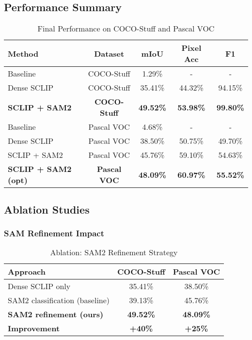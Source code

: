 \subsection{Performance Summary}

\begin{table}[h]
\centering
\caption{Final Performance on COCO-Stuff and Pascal VOC}
\label{tab:final_results}
\begin{tabular}{lcccc}
\hline
\textbf{Method} & \textbf{Dataset} & \textbf{mIoU} & \textbf{Pixel Acc} & \textbf{F1} \\
\hline
Baseline & COCO-Stuff & 1.29\% & - & - \\
Dense SCLIP & COCO-Stuff & 35.41\% & 44.32\% & 94.15\% \\
\textbf{SCLIP + SAM2} & \textbf{COCO-Stuff} & \textbf{49.52\%} & \textbf{53.98\%} & \textbf{99.80\%} \\
\hline
Baseline & Pascal VOC & 4.68\% & - & - \\
Dense SCLIP & Pascal VOC & 38.50\% & 50.75\% & 49.70\% \\
SCLIP + SAM2 & Pascal VOC & 45.76\% & 59.10\% & 54.63\% \\
\textbf{SCLIP + SAM2 (opt)} & \textbf{Pascal VOC} & \textbf{48.09\%} & \textbf{60.97\%} & \textbf{55.52\%} \\
\hline
\end{tabular}
\end{table}

\subsection{Ablation Studies}

\subsubsection{SAM Refinement Impact}

\begin{table}[h]
\centering
\caption{Ablation: SAM2 Refinement Strategy}
\label{tab:ablation_sam}
\begin{tabular}{lcc}
\hline
\textbf{Approach} & \textbf{COCO-Stuff} & \textbf{Pascal VOC} \\
\hline
Dense SCLIP only & 35.41\% & 38.50\% \\
SAM2 classification (baseline) & 39.13\% & 45.76\% \\
\textbf{SAM2 refinement (ours)} & \textbf{49.52\%} & \textbf{48.09\%} \\
\hline
\textbf{Improvement} & \textbf{+40\%} & \textbf{+25\%} \\
\hline
\end{tabular}
\end{table}

